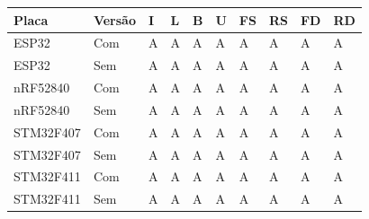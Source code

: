 \begin{tabular}{llllllllll}
\hline
Placa & Versão & I & L & B & U & FS & RS & FD & RD \\
\hline
ESP32 & Com & A & A & A & A & A & A & A & A \\
ESP32 & Sem & A & A & A & A & A & A & A & A \\
nRF52840 & Com & A & A & A & A & A & A & A & A \\
nRF52840 & Sem & A & A & A & A & A & A & A & A \\
STM32F407 & Com & A & A & A & A & A & A & A & A \\
STM32F407 & Sem & A & A & A & A & A & A & A & A \\
STM32F411 & Com & A & A & A & A & A & A & A & A \\
STM32F411 & Sem & A & A & A & A & A & A & A & A \\
\hline
\end{tabular}
